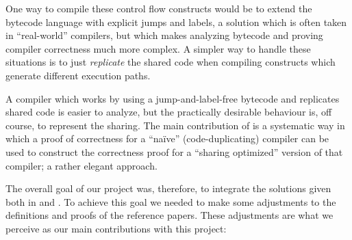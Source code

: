 \documentclass[a4paper]{article}
\begin{document}
        One way to compile these control flow constructs would be to extend the bytecode language with
        explicit jumps and labels, a solution which is often taken in ``real-world'' compilers,
        but which makes analyzing bytecode and proving compiler correctness much more complex.
        A simpler way to handle these situations is to just \emph{replicate} the shared code when
        compiling constructs which generate different execution paths.

        A compiler which works by using a jump-and-label-free bytecode and replicates shared code
        is easier to analyze, but the practically desirable behaviour is, off course, to represent
        the sharing. The main contribution of \cite{compiler-correctness-structured-graphs} is a
        systematic way in which a proof of correctness for a ``naïve'' (code-duplicating) compiler can
        be used to construct the correctness proof for a ``sharing optimized'' version of that compiler;
        a rather elegant approach.

        The overall goal of our project was, therefore, to integrate the solutions given both in
        \cite{typed-stack-safe-compiler} and \cite{compiler-correctness-structured-graphs}.
        To achieve this goal we needed to make some adjustments to the definitions and proofs of
        the reference papers. These adjustments are what we perceive as our main contributions
        with this project:
\end{document}
